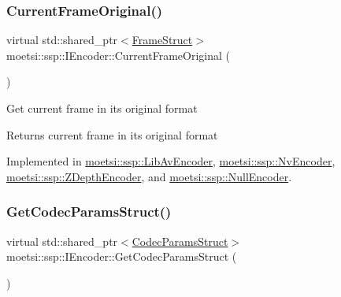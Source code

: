 \mbox{\label{classmoetsi_1_1ssp_1_1IEncoder_ab60bdaae0a85289dfa31a12bab533dc0}} 
\subsubsection{\texorpdfstring{Current\+Frame\+Original()}{CurrentFrameOriginal()}\hspace{0.1cm}{\footnotesize\ttfamily [2/2]}}
{\footnotesize\ttfamily virtual std\+::shared\+\_\+ptr$<$\hyperlink{structmoetsi_1_1ssp_1_1FrameStruct}{Frame\+Struct}$>$ moetsi\+::ssp\+::\+I\+Encoder\+::\+Current\+Frame\+Original (\begin{DoxyParamCaption}{ }\end{DoxyParamCaption})\hspace{0.3cm}{\ttfamily [pure virtual]}}

Get current frame in its original format \begin{DoxyReturn}{Returns}
current frame in its original format 
\end{DoxyReturn}


Implemented in \hyperlink{classmoetsi_1_1ssp_1_1LibAvEncoder_a249c65ad557f438d6856e875f01a1947}{moetsi\+::ssp\+::\+Lib\+Av\+Encoder}, \hyperlink{classmoetsi_1_1ssp_1_1NvEncoder_a56baf331eae448da89ee54b69fec170c}{moetsi\+::ssp\+::\+Nv\+Encoder}, \hyperlink{classmoetsi_1_1ssp_1_1ZDepthEncoder_abe5820ee0dea5fec22e398a7ba4d6777}{moetsi\+::ssp\+::\+Z\+Depth\+Encoder}, and \hyperlink{classmoetsi_1_1ssp_1_1NullEncoder_ad972dfdb93d2f609cdc885c53079ede2}{moetsi\+::ssp\+::\+Null\+Encoder}.

\mbox{\label{classmoetsi_1_1ssp_1_1IEncoder_ad5179efaa4c74207766dd64f46f4059a}} 
\subsubsection{\texorpdfstring{Get\+Codec\+Params\+Struct()}{GetCodecParamsStruct()}\hspace{0.1cm}{\footnotesize\ttfamily [1/2]}}
{\footnotesize\ttfamily virtual std\+::shared\+\_\+ptr$<$\hyperlink{structmoetsi_1_1ssp_1_1CodecParamsStruct}{Codec\+Params\+Struct}$>$ moetsi\+::ssp\+::\+I\+Encoder\+::\+Get\+Codec\+Params\+Struct (\begin{DoxyParamCaption}{ }\end{DoxyParamCaption})\hspace{0.3cm}{\ttfamily [pure virtual]}}

